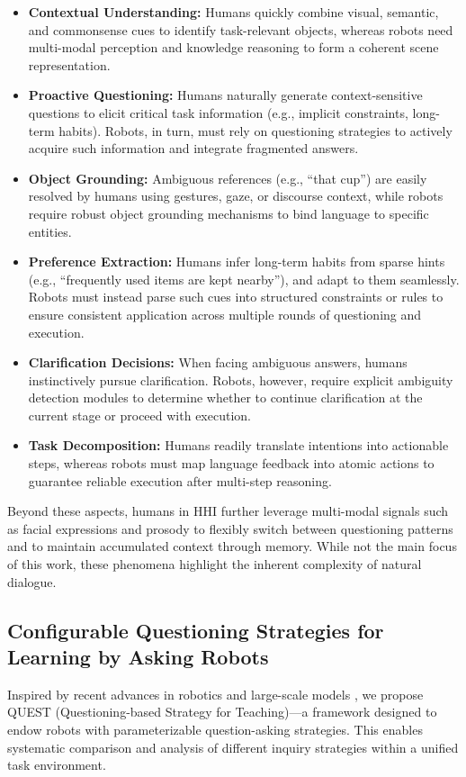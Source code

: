 \documentclass[sigconf,authordraft]{acmart}
\begin{document}
\begin{itemize}
    \item \textbf{Contextual Understanding:} Humans quickly combine visual, semantic, and commonsense cues to identify task-relevant objects, whereas robots need multi-modal perception and knowledge reasoning to form a coherent scene representation.  
    \item \textbf{Proactive Questioning:} Humans naturally generate context-sensitive questions to elicit critical task information (e.g., implicit constraints, long-term habits). Robots, in turn, must rely on questioning strategies to actively acquire such information and integrate fragmented answers.  
    \item \textbf{Object Grounding:} Ambiguous references (e.g., ``that cup'') are easily resolved by humans using gestures, gaze, or discourse context, while robots require robust object grounding mechanisms to bind language to specific entities.  
    \item \textbf{Preference Extraction:} Humans infer long-term habits from sparse hints (e.g., ``frequently used items are kept nearby''), and adapt to them seamlessly. Robots must instead parse such cues into structured constraints or rules to ensure consistent application across multiple rounds of questioning and execution.  
    \item \textbf{Clarification Decisions:} When facing ambiguous answers, humans instinctively pursue clarification. Robots, however, require explicit ambiguity detection modules to determine whether to continue clarification at the current stage or proceed with execution.  
    \item \textbf{Task Decomposition:} Humans readily translate intentions into actionable steps, whereas robots must map language feedback into atomic actions to guarantee reliable execution after multi-step reasoning.  
\end{itemize}

Beyond these aspects, humans in HHI further leverage multi-modal signals such as facial expressions and prosody to flexibly switch between questioning patterns and to maintain accumulated context through memory. While not the main focus of this work, these phenomena highlight the inherent complexity of natural dialogue.


\subsection{Configurable Questioning Strategies for Learning by Asking Robots}
Inspired by recent advances in robotics and large-scale models \cite{5ramrakhya2025grounding,lawley2024val,huang2023instruct2act}, we propose QUEST (Questioning-based Strategy for Teaching)—a framework designed to endow robots with parameterizable question-asking strategies. This enables systematic comparison and analysis of different inquiry strategies within a unified task environment.
\end{document}
